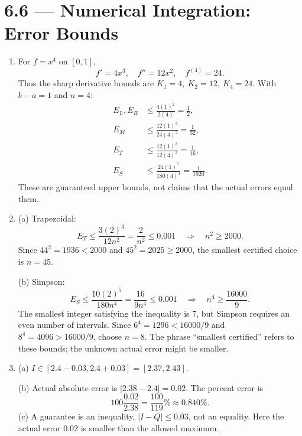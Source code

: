 \documentclass[11pt]{article}
\newcommand{\topic}[2]{\clearpage\section*{#1 --- #2}}
\begin{document}
\topic{6.6}{Numerical Integration: Error Bounds}
\begin{enumerate}[start=4]
\item For $f=x^4$ on $[0,1]$,
\[
f'=4x^3,\quad f''=12x^2,\quad f^{(4)}=24.
\]
Thus the sharp derivative bounds are $\boxed{K_1=4,\ K_2=12,\ K_4=24}$.
With $b-a=1$ and $n=4$:
\begin{align*}
E_L,E_R&\le\frac{4(1)^2}{2(4)}=\boxed{\frac12},\\
E_M&\le\frac{12(1)^3}{24(4)^2}=\boxed{\frac1{32}},\\
E_T&\le\frac{12(1)^3}{12(4)^2}=\boxed{\frac1{16}},\\
E_S&\le\frac{24(1)^5}{180(4)^4}=\boxed{\frac1{1920}}.
\end{align*}
These are guaranteed upper bounds, not claims that the actual errors equal them.
\item (a) Trapezoidal:
\[
E_T\le\frac{3(2)^3}{12n^2}=\frac2{n^2}\le0.001
\quad\Longrightarrow\quad n^2\ge2000.
\]
Since $44^2=1936<2000$ and $45^2=2025\ge2000$, the smallest certified choice is $\boxed{n=45}$.

(b) Simpson:
\[
E_S\le\frac{10(2)^5}{180n^4}=\frac{16}{9n^4}\le0.001
\quad\Longrightarrow\quad n^4\ge\frac{16000}{9}.
\]
The smallest integer satisfying the inequality is $7$, but Simpson requires an even number of intervals. Since $6^4=1296<16000/9$ and $8^4=4096>16000/9$, choose $\boxed{n=8}$.
The phrase ``smallest certified'' refers to these bounds; the unknown actual error might be smaller.
\item (a) $I\in[2.4-0.03,2.4+0.03]=\boxed{[2.37,2.43]}$.

(b) Actual absolute error is $\boxed{|2.38-2.4|=0.02}$.
The percent error is
\[
100\frac{0.02}{2.38}=\frac{100}{119}\%\approx\boxed{0.840\%}.
\]
(c) A guarantee is an inequality, $|I-Q|\le0.03$, not an equality. Here the actual error $0.02$ is smaller than the allowed maximum.
\end{enumerate}
\end{document}
